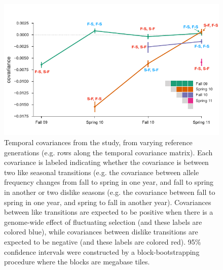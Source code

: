 \documentclass[11pt]{article}
\newcommand{\gc}[1]{{\it \color{red} #1 } }
\begin{document}
\begin{figure}[!ht]
  \centering
  \includegraphics[]{figures/bergland-covs-figure.pdf}

  \caption{Temporal covariances from the \textcite{Bergland2014-ij} study, from
    varying reference generations (e.g. rows along the temporal covariance
    matrix). Each covariance is labeled indicating whether the covariance is
    between two like seasonal transitions (e.g. the covariance between allele
    frequency changes from fall to spring in one year, and fall to spring in
    another or two dislike seasons (e.g. the covariance between fall to spring
    in one year, and spring to fall in another year). Covariances between like
    transitions are expected to be positive when there is a genome-wide effect
    of fluctuating selection (and these labels are colored blue), while
    covariances between dislike transitions are expected to be negative (and
    these labels are colored red). 95\% confidence intervals were constructed
    by a block-bootstrapping procedure where the blocks are megabase tiles.}

  \label{suppfig:bergland-covs-figure}
\end{figure}



\end{document}
